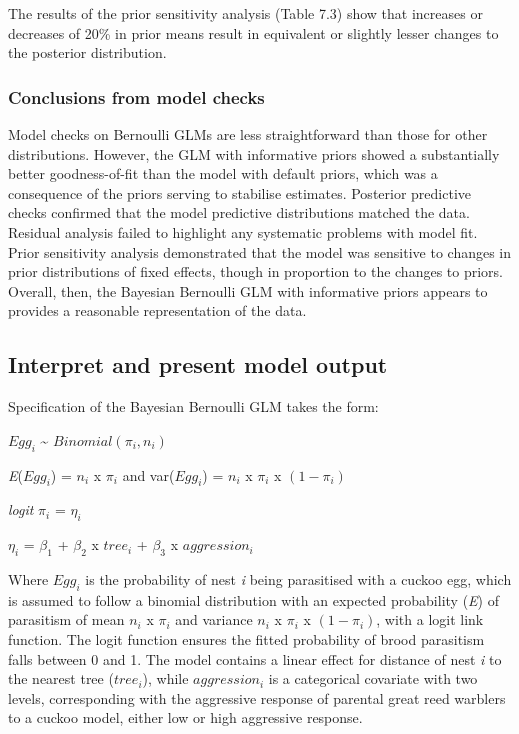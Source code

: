 \documentclass[
]{book}
\begin{document}
The results of the prior sensitivity analysis (Table 7.3) show that increases or decreases of 20\% in prior means result in equivalent or slightly lesser changes to the posterior distribution.

\hypertarget{bern-checkconc}{%
\subsubsection{Conclusions from model checks}\label{bern-checkconc}}

Model checks on Bernoulli GLMs are less straightforward than those for other distributions. However, the GLM with informative priors showed a substantially better goodness-of-fit than the model with default priors, which was a consequence of the priors serving to stabilise estimates. Posterior predictive checks confirmed that the model predictive distributions matched the data. Residual analysis failed to highlight any systematic problems with model fit. Prior sensitivity analysis demonstrated that the model was sensitive to changes in prior distributions of fixed effects, though in proportion to the changes to priors. Overall, then, the Bayesian Bernoulli GLM with informative priors appears to provides a reasonable representation of the data.

\hypertarget{bern-present}{%
\subsection{Interpret and present model output}\label{bern-present}}

Specification of the Bayesian Bernoulli GLM takes the form:

\(Egg_{i}\) \textasciitilde{} \(Binomial(\pi_{i}, n_{i})\)

\emph{E}(\(Egg_{i}\)) = \(n_i\) x \(\pi_{i}\) and var(\(Egg_{i}\)) = \(n_i\) x \(\pi_{i}\) x \((1 - \pi_{i})\)

\emph{logit} \(\pi_i\) = \(\eta_{i}\)

\(\eta_i\) = \(\beta_1\) + \(\beta_2\) x \(tree_{i}\) + \(\beta_3\) x \(aggression_{i}\)

Where \(Egg_{i}\) is the probability of nest \emph{i} being parasitised with a cuckoo egg, which is assumed to follow a binomial distribution with an expected probability (\emph{E}) of parasitism of mean \(n_i\) x \(\pi_{i}\) and variance \(n_i\) x \(\pi_{i}\) x \((1 - \pi_{i})\), with a logit link function. The logit function ensures the fitted probability of brood parasitism falls between 0 and 1. The model contains a linear effect for distance of nest \emph{i} to the nearest tree (\(tree_{i}\)), while \(aggression_{i}\) is a categorical covariate with two levels, corresponding with the aggressive response of parental great reed warblers to a cuckoo model, either low or high aggressive response.
\end{document}
